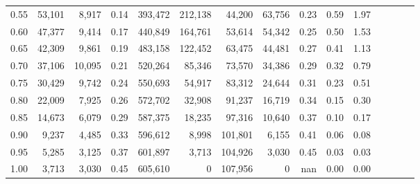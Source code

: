 \begin{tabular}{rrrcrrrrrrrrrrr}
0.55 &  53,101 &   8,917 &                                       0.14 &  393,472 &  212,138 &   44,200 &   63,756 &  0.23 &  0.59 &                         1.97 \\
0.60 &  47,377 &   9,414 &                                       0.17 &  440,849 &  164,761 &   53,614 &   54,342 &  0.25 &  0.50 &                         1.53 \\
0.65 &  42,309 &   9,861 &                                       0.19 &  483,158 &  122,452 &   63,475 &   44,481 &  0.27 &  0.41 &                         1.13 \\
0.70 &  37,106 &  10,095 &                                       0.21 &  520,264 &   85,346 &   73,570 &   34,386 &  0.29 &  0.32 &                         0.79 \\
0.75 &  30,429 &   9,742 &                                       0.24 &  550,693 &   54,917 &   83,312 &   24,644 &  0.31 &  0.23 &                         0.51 \\
0.80 &  22,009 &   7,925 &                                       0.26 &  572,702 &   32,908 &   91,237 &   16,719 &  0.34 &  0.15 &                         0.30 \\
0.85 &  14,673 &   6,079 &                                       0.29 &  587,375 &   18,235 &   97,316 &   10,640 &  0.37 &  0.10 &                         0.17 \\
0.90 &   9,237 &   4,485 &                                       0.33 &  596,612 &    8,998 &  101,801 &    6,155 &  0.41 &  0.06 &                         0.08 \\
0.95 &   5,285 &   3,125 &                                       0.37 &  601,897 &    3,713 &  104,926 &    3,030 &  0.45 &  0.03 &                         0.03 \\
1.00 &   3,713 &   3,030 &                                       0.45 &  605,610 &        0 &  107,956 &        0 &   nan &  0.00 &                         0.00 \\
\bottomrule
\end{tabular}
